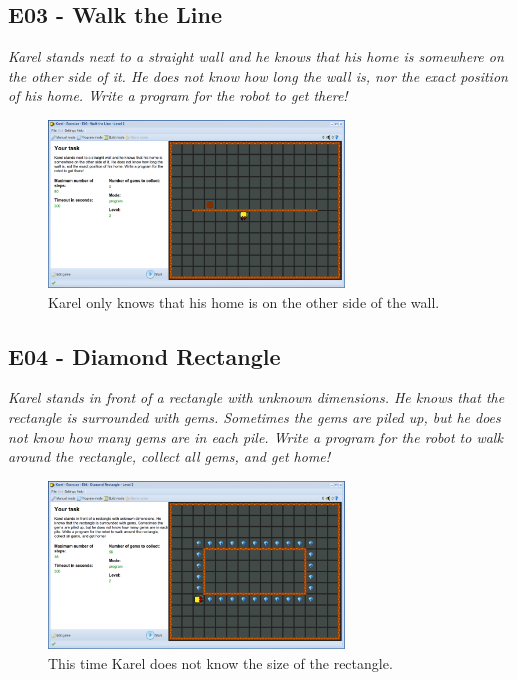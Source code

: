 \documentclass[article,A4,12pt]{llncs}
\begin{document}
\subsection{E03 - Walk the Line}

{\em Karel stands next to a straight wall and he knows that his home is somewhere on the other side of it. He does not know how long the wall is, nor the exact position of his home. Write a program for the robot to get there!}

\begin{figure}[!ht]
\begin{center}
\includegraphics[width=0.7\textwidth]{img/e03.png}
\end{center}
\vspace{-4mm}
\caption{Karel only knows that his home is on the other side of the wall.}
\label{fig:e03}
\vspace{-10mm}
\end{figure}
\noindent

\subsection{E04 - Diamond Rectangle}

{\em Karel stands in front of a rectangle with unknown dimensions. He knows that the rectangle is surrounded with gems. Sometimes the gems are piled up, but he does not know how many gems are in each pile. Write a program for the robot to walk around the rectangle, collect all gems, and get home!}

\newpage

\begin{figure}[!ht]
\begin{center}
\includegraphics[width=0.7\textwidth]{img/e04.png}
\end{center}
\vspace{-4mm}
\caption{This time Karel does not know the size of the rectangle.}
\label{fig:e04}
\vspace{-10mm}
\end{figure}
\noindent
\end{document}
